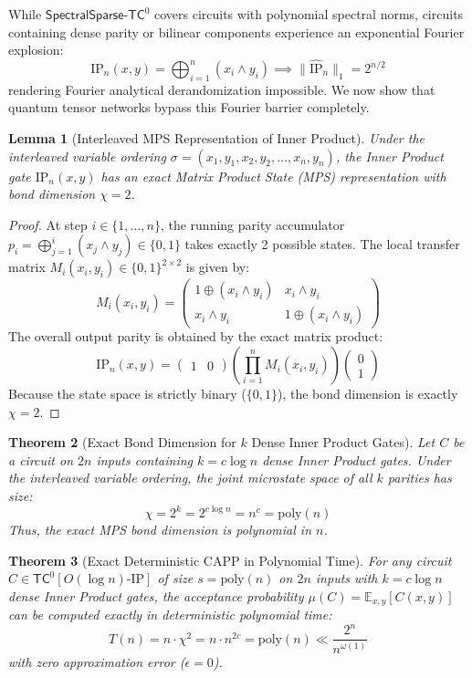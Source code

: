 \documentclass[11pt,a4paper]{article}
\newtheorem{theorem}{Theorem}[section]
\newtheorem{lemma}[theorem]{Lemma}
\theoremstyle{definition}
\theoremstyle{remark}
\newcommand{\TC}{\mathsf{TC}}
\newcommand{\poly}{\mathrm{poly}}
\newcommand{\E}{\mathbb{E}}
\newcommand{\SparseTC}{\mathsf{SpectralSparse}\text{-}\mathsf{TC}^0}
\newcommand{\IP}{\mathrm{IP}}
\begin{document}
While $\SparseTC$ covers circuits with polynomial spectral norms, circuits containing dense parity or bilinear components experience an exponential Fourier explosion:
\[
\IP_n(x, y) = \bigoplus_{i=1}^n (x_i \land y_i) \implies \|\widehat{\IP}_n\|_1 = 2^{n/2}
\]
rendering Fourier analytical derandomization impossible. We now show that quantum tensor networks bypass this Fourier barrier completely.

\begin{lemma}[Interleaved MPS Representation of Inner Product]\label{lem:ip_mps}
Under the interleaved variable ordering $\sigma = (x_1, y_1, x_2, y_2, \dots, x_n, y_n)$, the Inner Product gate $\IP_n(x, y)$ has an exact Matrix Product State (MPS) representation with bond dimension $\chi = 2$.
\end{lemma}

\begin{proof}
At step $i \in \{1, \dots, n\}$, the running parity accumulator $p_i = \bigoplus_{j=1}^i (x_j \land y_j) \in \{0, 1\}$ takes exactly 2 possible states. The local transfer matrix $M_i(x_i, y_i) \in \{0,1\}^{2 \times 2}$ is given by:
\[
M_i(x_i, y_i) = \begin{pmatrix} 1 \oplus (x_i \land y_i) & x_i \land y_i \\ x_i \land y_i & 1 \oplus (x_i \land y_i) \end{pmatrix}
\]
The overall output parity is obtained by the exact matrix product:
\[
\IP_n(x, y) = \begin{pmatrix} 1 & 0 \end{pmatrix} \left( \prod_{i=1}^n M_i(x_i, y_i) \right) \begin{pmatrix} 0 \\ 1 \end{pmatrix}
\]
Because the state space is strictly binary ($\{0, 1\}$), the bond dimension is exactly $\chi = 2$.
\end{proof}

\begin{theorem}[Exact Bond Dimension for $k$ Dense Inner Product Gates]\label{thm:k_ip_mps}
Let $C$ be a circuit on $2n$ inputs containing $k = c \log n$ dense Inner Product gates. Under the interleaved variable ordering, the joint microstate space of all $k$ parities has size:
\[
\chi = 2^k = 2^{c \log n} = n^c = \poly(n)
\]
Thus, the exact MPS bond dimension is polynomial in $n$.
\end{theorem}

\begin{theorem}[Exact Deterministic CAPP in Polynomial Time]\label{thm:exact_capp}
For any circuit $C \in \TC^0[O(\log n)\text{-}\mathrm{IP}]$ of size $s = \poly(n)$ on $2n$ inputs with $k = c \log n$ dense Inner Product gates, the acceptance probability $\mu(C) = \E_{x, y}[C(x, y)]$ can be computed \emph{exactly} in deterministic polynomial time:
\[
T(n) = n \cdot \chi^2 = n \cdot n^{2c} = \poly(n) \ll \frac{2^n}{n^{\omega(1)}}
\]
with zero approximation error ($\epsilon = 0$).
\end{theorem}
\end{document}

